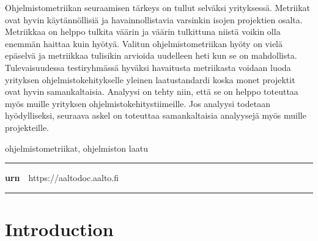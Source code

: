 \begin{spacing}{1.05}
{Ohjelmistometriikan seuraamisen tärkeys on tullut selväksi yrityksessä. Metriikat ovat hyvin käytännöllisiä ja havainnollistavia varsinkin isojen projektien osalta. Metriikkaa on helppo tulkita väärin ja väärin tulkittuna niistä voikin olla enemmän haittaa kuin hyötyä. Valitun ohjelmistometriikan hyöty on vielä epäselvä ja metriikkaa tulisikin arvioida uudelleen heti kun se on mahdollista. Tulevaisuudessa testiryhmässä hyväksi havaitusta metriikasta voidaan luoda yrityksen ohjelmistokehitykselle yleinen laatustandardi koska monet projektit ovat hyvin samankaltaisia. Analyysi on tehty niin, että se on helppo toteuttaa myös muille yrityksen ohjelmistokehitystiimeille. Jos analyysi todetaan hyödylliseksi, seuraava askel on toteuttaa samankaltaisia analyysejä myös muille projekteille.
}

\vfill

\end{spacing}
\begin{spacing}{.88}
{\parindent0pt %

\parbox[t]{121.6mm}{\raggedright\small ohjelmistometriikat, ohjelmiston laatu}

\vspace{.5mm}\rule{\textwidth}{.75pt}

{\fontsize{10.5pt}{10.5pt}\bfseries\sffamily\lsstyle urn}~~{\small https://aaltodoc.aalto.fi}

\vspace{-2.4mm}\rule{\textwidth}{.75pt}

} %
\end{spacing}

\restoregeometry  %




\newpage

\tableofcontents


\newpage



\chapter{Introduction}

